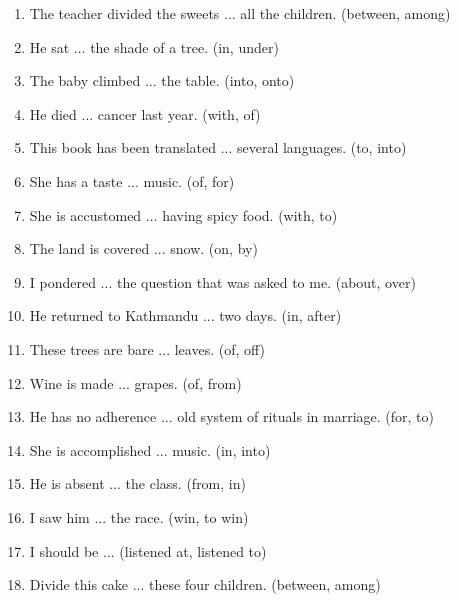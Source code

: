 \documentclass[12pt]{article}
\begin{document}
\begin{enumerate}
    \item The teacher divided the sweets ... all the children. \hfill (between, among)

    \item He sat ... the shade of a tree. \hfill (in, under)

    \item The baby climbed ... the table. \hfill (into, onto)

    \item He died ... cancer last year. \hfill (with, of)

    \item This book has been translated ... several languages. \hfill (to, into)

    \item She has a taste ... music. \hfill (of, for)

    \item She is accustomed ... having spicy food. \hfill (with, to)

    \item The land is covered ... snow. \hfill (on, by)

    \item I pondered ... the question that was asked to me. \hfill (about, over)

    \item He returned to Kathmandu ... two days. \hfill (in, after)

    \item These trees are bare ... leaves. \hfill (of, off)

    \item Wine is made ... grapes. \hfill (of, from)

    \item He has no adherence ... old system of rituals in marriage. \hfill (for, to)

    \item She is accomplished ... music. \hfill (in, into)

    \item He is absent ... the class. \hfill (from, in)

    \item I saw him ... the race. \hfill (win, to win)

    \item I should be ... \hfill (listened at, listened to)

    \item Divide this cake ... these four children. \hfill (between, among)


\end{enumerate}
\end{document}

